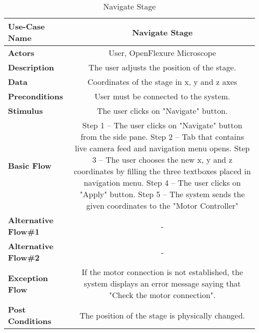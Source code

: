 \begin{table}[H]
     \centering
     \begin{tabular}{|l|C|}
         \hline
          \textbf{Use-Case Name} & Navigate Stage \\
         \hline
          \textbf{Actors} & User, OpenFlexure Microscope \\ 
         \hline
          \textbf{Description} & The user adjusts the position of the stage. \\ 
         \hline
          \textbf{Data} & Coordinates of the stage in x, y and z axes\\ 
         \hline
          \textbf{Preconditions} & 
          User must be connected to the system. \\
         \hline
          \textbf{Stimulus} & The user clicks on "Navigate" button.\\ 
         \hline
          \textbf{Basic Flow} & 
          Step 1 -- The user clicks on "Navigate" button from the side pane. \newline
          Step 2 -- Tab that contains live camera feed and navigation menu opens. \newline
          Step 3 -- The user chooses the new x, y and z coordinates by filling the three textboxes placed in navigation menu. \newline
		  Step 4 -- The user clicks on "Apply" button. \newline
		  Step 5 -- The system sends the given coordinates to the "Motor Controller" \\
         \hline
          \textbf{Alternative Flow\#1} & - \\
         \hline
          \textbf{Alternative Flow\#2} & - \\
         \hline
          \textbf{Exception Flow} & If the motor connection is not established, the system displays an error message saying that "Check the motor connection".\\
         \hline
          \textbf{Post Conditions} & The position of the stage is physically changed. \\ 
         \hline
     \end{tabular}
     \caption{Navigate Stage}
     \label{tab:navigate_stage}
 \end{table}